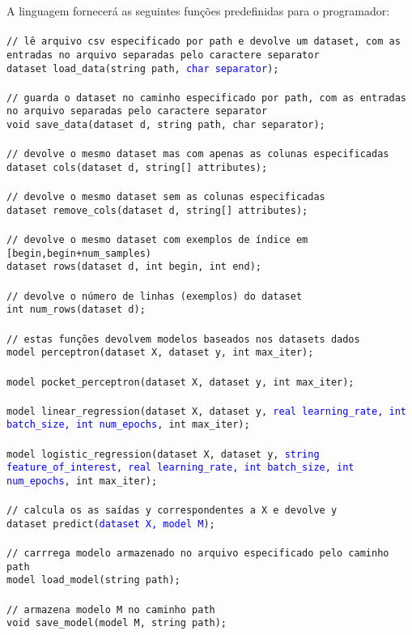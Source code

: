 \documentclass[12pt]{article}
\newcommand{\blu}{\textcolor{blue}}
\begin{document}
A linguagem fornecerá as seguintes funções predefinidas para o programador:
\\
\\
\texttt{// lê arquivo csv especificado por path e devolve um dataset, com as entradas no arquivo separadas pelo caractere separator
\\
dataset load\_data(string path, \blu{char separator});
\\
\\ 
// guarda o dataset no caminho especificado por path, com as entradas no arquivo separadas pelo caractere separator
\\
void save\_data(dataset d, string path, char separator);
\\
\\
// devolve o mesmo dataset mas com apenas as colunas especificadas
\\ 
dataset cols(dataset d, string[] attributes);
\\
\\
// devolve o mesmo dataset sem as colunas especificadas
\\
dataset remove\_cols(dataset d, string[] attributes);
\\
\\
// devolve o mesmo dataset com exemplos de índice em [begin,begin+num\_samples)
\\
dataset rows(dataset d, int begin, int end);
\\
\\
// devolve o número de linhas (exemplos) do dataset
\\
int num\_rows(dataset d);
\\
\\
// estas funções devolvem modelos baseados nos datasets dados
\\
model perceptron(dataset X, dataset y, int max\_iter);
\\ 
\\
model pocket\_perceptron(dataset X, dataset y, int max\_iter);
\\
\\
model linear\_regression(dataset X, dataset y, \blu{real learning\_rate, int batch\_size, int num\_epochs}, int max\_iter);
\\
\\
model logistic\_regression(dataset X, dataset y, \blu{string feature\_of\_interest, real learning\_rate, int batch\_size, int num\_epochs}, int max\_iter);
\\
\\
// calcula os as saídas y correspondentes a X e devolve y 
\\
dataset predict(\blu{dataset X, model M});
\\
\\
// carrrega modelo armazenado no arquivo especificado pelo caminho path
\\
model load\_model(string path);
\\
\\
// armazena modelo M no caminho path
\\
void save\_model(model M, string path);
}
\end{document}
